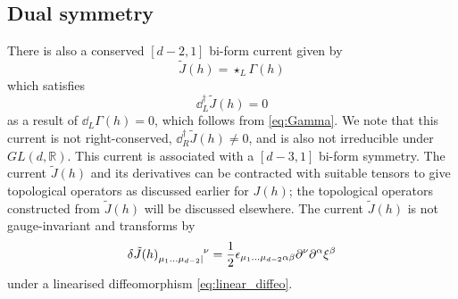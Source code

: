 \subsection{Dual symmetry}
\label{sec:dual_symmetries}

There is also a conserved $[d-2,1]$ bi-form current given by
\begin{equation}\label{eq:Jtilde}
    \tilde{J}(h) = \star_L \Gamma(h)
\end{equation}
which satisfies
\begin{equation}\label{eq:Jtilde_conserved}
    \dd^\dag_L \tilde{J}(h) = 0
\end{equation}
as a result of $\dd_L \Gamma(h) = 0$, which follows from \eqref{eq:Gamma}. We note that this current is not right-conserved, $\dd^\dag_R \tilde{J}(h) \neq 0$, and is also not irreducible under $GL(d,\mathbb{R})$. This current is associated with a $[d-3,1]$ bi-form symmetry. 
The current $\tilde{J}(h)$ and its derivatives can be contracted with suitable tensors to give topological operators as discussed earlier for $J(h)$; the topological operators constructed from $\tilde{J}(h)$ will be discussed elsewhere.
The current $\tilde{J}(h)$ is not gauge-invariant and transforms by
\begin{equation}
    \delta \tilde{J}(h)\indices{_{\mu_1\dots\mu_{d-2}|}^\nu} = \frac{1}{2} \epsilon_{\mu_1\dots\mu_{d-2}\alpha\beta} \partial^\nu \partial^\alpha \xi^\beta
\end{equation}
under a linearised diffeomorphism \eqref{eq:linear_diffeo}.

